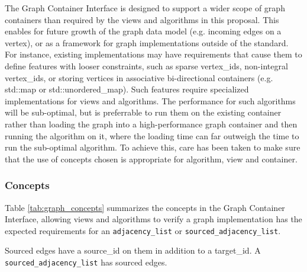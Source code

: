 \documentclass[10pt,onecolumn]{article}
\newcommand{\tcode}[1]{\lstinline[breaklines=true]{#1}}
\begin{document}
The Graph Container Interface is designed to support a wider scope of graph containers than required by the views and algorithms in this proposal. This enables for future growth of the graph data model (e.g. incoming edges on a vertex), or as a framework for graph implementations outside of the standard. For instance, existing implementations may have requirements that cause them to define features with looser constraints, such as sparse vertex\_ids, non-integral vertex\_ids, or storing vertices in associative bi-directional containers (e.g. std::map or std::unordered\_map). Such features require specialized implementations for views and algorithms. The performance for such algorithms will be sub-optimal, but is preferrable to run them on the existing container rather than loading the graph into a high-performance graph container and then running the algorithm on it, where the loading time can far outweigh the time to run the sub-optimal algorithm. To achieve this, care has been taken to make sure that the use of concepts chosen is appropriate for algorithm, view and container.

\subsubsection{Concepts}
Table \ref{tab:graph_concepts} summarizes the concepts in the Graph Container Interface, allowing views and algorithms to verify a graph implementation has the expected requirements for an \tcode{adjacency_list} or \tcode{sourced_adjacency_list}.

Sourced edges have a source\_id on them in addition to a target\_id. A \tcode{sourced_adjacency_list} has sourced edges.
\end{document}
